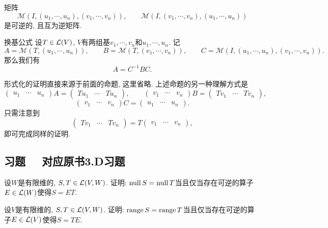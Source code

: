 \begin{example}
	矩阵$$\mathcal{M} (I,(u_1,\cdots ,u_n),(v_1,\cdots ,v_n)),\qquad \mathcal{M} (I,(v_1,\cdots ,v_n),(u_1,\cdots ,u_n))$$
	是可逆的, 且互为逆矩阵. 
\end{example}

\begin{proposition}{换基公式}
	设$T\in \mathcal{L} (V)$, $V$有两组基$v_1,\cdots ,v_n$和$u_1,\cdots ,u_n$. 记$$A = \mathcal{M}(T,(u_1,\cdots ,u_n)),\qquad B=\mathcal{M}(T,(v_1,\cdots ,v_n)),\qquad C=\mathcal{M}(I,(u_1,\cdots ,u_n),(v_1,\cdots ,v_n)).$$
	那么我们有$$A=C^{-1}BC.$$
\end{proposition}

形式化的证明直接来源于前面的命题, 这里省略. 上述命题的另一种理解方式是$$\begin{pmatrix}
 u_1 & \cdots & u_n
\end{pmatrix} A = \begin{pmatrix}
 Tu_1 & \cdots & Tu_n
\end{pmatrix},\qquad \begin{pmatrix}
 v_1 & \cdots & v_n
\end{pmatrix} B = \begin{pmatrix}
 Tv_1 & \cdots & Tv_n
\end{pmatrix}, $$
$$\begin{pmatrix}
 v_1 & \cdots & v_n
\end{pmatrix} C = \begin{pmatrix}
 u_1 & \cdots & u_n
\end{pmatrix}. $$
只需注意到$$\begin{pmatrix}
 Tv_1 & \cdots & Tv_n
\end{pmatrix} = T\begin{pmatrix}
 v_1 & \cdots & v_n
\end{pmatrix}, $$
即可完成同样的证明. 

\newpage
\subsection*{习题  ~~\small 对应原书3.D习题}

\begin{exercise} %
	设$W$是有限维的, $S,T \in \mathcal{L} (V,W)$. 证明: $\operatorname{null} S = \operatorname{null} T$当且仅当存在可逆的算子$E \in \mathcal{L} (W)$使得$S=ET$. 
\end{exercise}
\vspace{1em}

\begin{exercise} %
	设$V$是有限维的, $S,T \in \mathcal{L} (V,W)$. 证明: $\operatorname{range} S = \operatorname{range} T$当且仅当存在可逆的算子$E \in \mathcal{L} (V)$使得$S=TE$. 
\end{exercise}
\vspace{1em}


